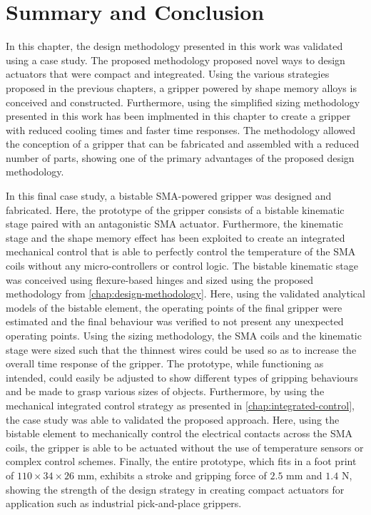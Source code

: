 \section{Summary and Conclusion}
In this chapter, the design methodology presented in this work was validated using a case study. The proposed methodology proposed novel ways to design actuators that were compact and integreated. Using the various strategies proposed in the previous chapters, a gripper powered by shape memory alloys is conceived and constructed. Furthermore, using the simplified sizing methodology presented in this work has been implmented in this chapter to create a gripper with reduced cooling times and faster time responses. The methodology allowed the conception of a gripper that can be fabricated and assembled with a reduced number of parts, showing one of the primary advantages of the proposed design methodology.

In this final case study, a bistable SMA-powered gripper was designed and fabricated. Here, the prototype of the gripper consists of a bistable kinematic stage paired with an antagonistic SMA actuator. Furthermore, the kinematic stage and the shape memory effect has been exploited to create an integrated mechanical control that is able to perfectly control the temperature of the SMA coils without any micro-controllers or control logic. The bistable kinematic stage was conceived using flexure-based hinges and sized using the proposed methodology from \cref{chap:design-methodology}. Here, using the validated analytical models of the bistable element, the operating points of the final gripper were estimated and the final behaviour was verified to not present any unexpected operating points. Using the sizing methodology, the SMA coils and the kinematic stage were sized such that the thinnest wires could be used so as to increase the overall time response of the gripper. The prototype, while functioning as intended, could easily be adjusted to show different types of gripping behaviours and be made to grasp various sizes of objects. Furthermore, by using the mechanical integrated control strategy as presented in \cref{chap:integrated-control}, the case study was able to validated the proposed approach. Here, using the bistable element to mechanically control the electrical contacts across the SMA coils, the gripper is able to be actuated without the use of temperature sensors or complex control schemes. Finally, the entire prototype, which fits in a foot print of $110\times34\times26$ mm, exhibits a stroke and gripping force of $2.5$ mm and $1.4$ N, showing the strength of the design strategy in creating compact actuators for application such as industrial pick-and-place grippers.


